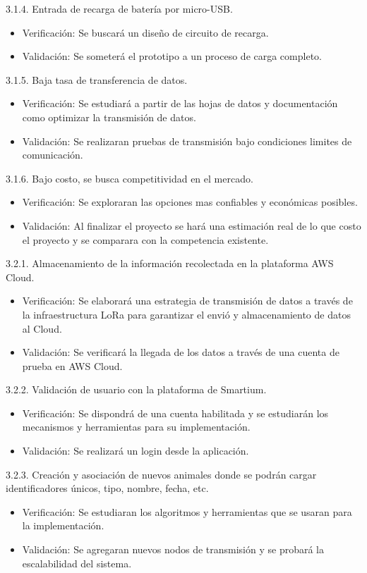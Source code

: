 \documentclass[11pt]{charter}
\begin{document}
3.1.4. Entrada de recarga de batería por micro-USB.
\begin{itemize}
	\item Verificación: Se buscará un diseño de circuito de recarga. 
	\item Validación: Se someterá el prototipo a un proceso de carga completo. 
\end{itemize}

3.1.5. Baja tasa de transferencia de datos. 
\begin{itemize}
	\item Verificación: Se estudiará a partir de las hojas de datos y documentación como optimizar la transmisión de datos. 
	\item Validación: Se realizaran pruebas de transmisión bajo condiciones limites de comunicación. 
\end{itemize}

3.1.6. Bajo costo, se busca competitividad en el mercado.
\begin{itemize}
	\item Verificación: Se exploraran las opciones mas confiables y económicas posibles. 
	\item Validación: Al finalizar el proyecto se hará una estimación real de lo que costo el proyecto y se comparara con la competencia existente. 
\end{itemize}

3.2.1. Almacenamiento de la información recolectada en la plataforma AWS Cloud. 
\begin{itemize}
	\item Verificación: Se elaborará una estrategia de transmisión de datos a través de la infraestructura LoRa para garantizar el envió y almacenamiento de datos al Cloud. 
	\item Validación: Se verificará la llegada de los datos a través de una cuenta de prueba en AWS Cloud. 
\end{itemize}

3.2.2. Validación de usuario con la plataforma de Smartium.
\begin{itemize}
	\item Verificación: Se dispondrá de una cuenta habilitada y se estudiarán los mecanismos y herramientas para su implementación. 
	\item Validación: Se realizará un login desde la aplicación. 
\end{itemize}

3.2.3. Creación y asociación de nuevos animales donde se podrán cargar identificadores únicos, tipo, nombre, fecha, etc. 
\begin{itemize}
	\item Verificación: Se estudiaran los algoritmos y herramientas que se usaran para la implementación. 
	\item Validación: Se agregaran nuevos nodos de transmisión y se probará la escalabilidad del sistema. 
\end{itemize}
\end{document}

